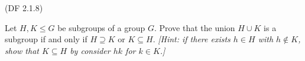 \begin{problem} \textsf{(DF 2.1.8)}

  \noindent
  Let $H,K \leq G$ be subgroups of a group $G$.  Prove that the union $H \cup K$ is a
  subgroup if and only if $H \supseteq K$ or $K \subseteq H$.  \emph{[Hint: if there 
  exists $h \in H$ with $h \not \in K$, show that $K \subseteq H$ by consider $hk$ 
  for $k \in K$.]}
\end{problem}

